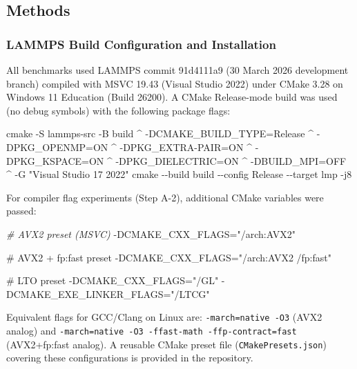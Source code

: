 \documentclass[
  11pt,
]{article}
\newenvironment{Shaded}{}{}
\newcommand{\CommentTok}[1]{\textcolor[rgb]{0.38,0.63,0.69}{\textit{#1}}}
\newcommand{\FunctionTok}[1]{\textcolor[rgb]{0.02,0.16,0.49}{#1}}
\newcommand{\NormalTok}[1]{#1}
\begin{document}
\subsection{Methods}\label{methods}

\subsubsection{LAMMPS Build Configuration and
Installation}\label{lammps-build-configuration-and-installation}

All benchmarks used LAMMPS commit 91d4111a9 (30 March 2026 development
branch) compiled with MSVC 19.43 (Visual Studio 2022) under CMake 3.28
on Windows 11 Education (Build 26200). A CMake Release-mode build was
used (no debug symbols) with the following package flags:

\begin{Shaded}
\begin{Highlighting}[]
\FunctionTok{cmake {-}S lammps{-}src {-}B build \^{}}
\FunctionTok{  {-}DCMAKE\_BUILD\_TYPE=Release \^{}}
\FunctionTok{  {-}DPKG\_OPENMP=ON \^{}}
\FunctionTok{  {-}DPKG\_EXTRA{-}PAIR=ON \^{}}
\FunctionTok{  {-}DPKG\_KSPACE=ON \^{}}
\FunctionTok{  {-}DPKG\_DIELECTRIC=ON \^{}}
\FunctionTok{  {-}DBUILD\_MPI=OFF \^{}}
\FunctionTok{  {-}G "Visual Studio 17 2022"}
\FunctionTok{cmake {-}{-}build build {-}{-}config Release {-}{-}target lmp {-}j8}
\end{Highlighting}
\end{Shaded}

For compiler flag experiments (Step A-2), additional CMake variables
were passed:

\begin{Shaded}
\begin{Highlighting}[]
\CommentTok{\# AVX2 preset (MSVC)}
\NormalTok{{-}}\FunctionTok{DCMAKE\_CXX\_FLAGS="/arch:AVX2"}

\FunctionTok{\# AVX2 + fp:fast preset}
\FunctionTok{{-}DCMAKE\_CXX\_FLAGS="/arch:AVX2 /fp:fast"}

\FunctionTok{\# LTO preset}
\FunctionTok{{-}DCMAKE\_CXX\_FLAGS="/GL" {-}DCMAKE\_EXE\_LINKER\_FLAGS="/LTCG"}
\end{Highlighting}
\end{Shaded}

Equivalent flags for GCC/Clang on Linux are: \texttt{-march=native\ -O3}
(AVX2 analog) and
\texttt{-march=native\ -O3\ -ffast-math\ -ffp-contract=fast}
(AVX2+fp:fast analog). A reusable CMake preset file
(\texttt{CMakePresets.json}) covering these configurations is provided
in the repository.
\end{document}
